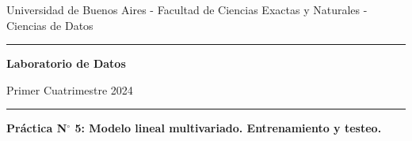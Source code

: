 \documentclass[a4paper,11pt]{article}
\theoremstyle{definition}
\begin{document}
\centerline{{\small Universidad de Buenos Aires - Facultad de Ciencias Exactas y Naturales - Ciencias de Datos}}

\vskip 0.2cm

\hrule

\vskip 0.2cm

 \centerline{{\bf\Large{\sc Laboratorio de Datos}}}

 \vskip 0.2cm

 \centerline{\ttfamily Primer Cuatrimestre 2024}

\vskip 0.2cm

 \hrule

 \bigskip
 \centerline{\bf Práctica N$^\circ$ 5: Modelo lineal multivariado. Entrenamiento y testeo.}
 \bigskip


\end{document}
